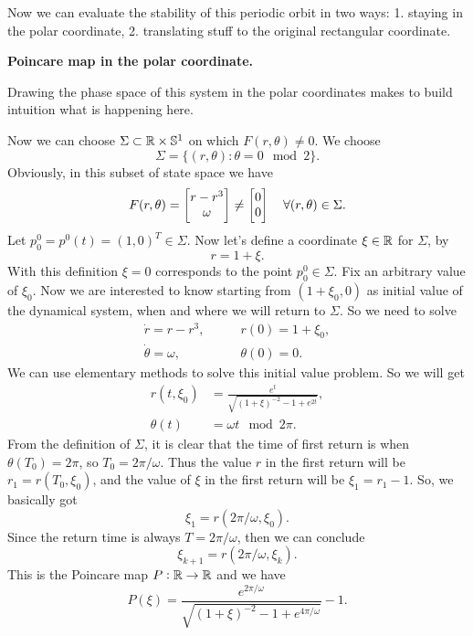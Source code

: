 \begin{ans}
	Now we can evaluate the stability of this periodic orbit in two ways: 1. staying in the polar coordinate, 2. translating stuff to the original rectangular coordinate.
	
	\textbf{Poincare map in the polar coordinate.}		
	
	Drawing the phase space of this system in the polar coordinates makes to build intuition what is happening here.
	
	Now we can choose $\Sigma \subset \mathbb{R}\times\mathbb{S}^1$ on which $F(r,\theta)\neq 0$. We choose
	\[ \Sigma = \{ (r, \theta): \theta =0 \mod2 \}. \]
	Obviously, in this subset of state space we have
	\[ F(r, \theta) = \begin{bmatrix} r - r^3 \\ \omega \end{bmatrix} \neq \begin{bmatrix} 0 \\ 0 \end{bmatrix} \quad \forall (r,\theta) \in \Sigma.\]
	Let $p_0^0 = p^0(t) = (1,0)^T \in \Sigma$. Now let's define a coordinate $\xi\in\mathbb{R}$ for $\Sigma$, by 
	\[ r = 1 + \xi. \]
	With this definition $\xi=0$ corresponds to the point $p_0^0 \in \Sigma$. Fix an arbitrary value of $\xi_0$. Now we are interested to know starting from $(1+\xi_0,0)$ as initial value of the dynamical system, when and where we will return to $\Sigma$. So we need to solve
	\begin{align*}
		\dot{r} = r - r^3, \qquad &r(0) = 1+\xi_0,\\
		\dot{\theta} = \omega, \qquad &\theta(0) = 0.
	\end{align*}
	We can use elementary methods to solve this initial value problem. So we will get
	\begin{align*}
		r(t,\xi_0) &= \frac{e^t}{\sqrt{(1+\xi)^{-2} - 1 + e^{2t}}}, \\
		\theta(t) &= \omega t \mod2\pi.
	\end{align*}
	From the definition of $\Sigma$, it is clear that the time of first return is when $\theta(T_0) = 2\pi$, so $T_0=2\pi/\omega$. Thus the value $r$ in the first return will be $r_1 = r(T_0,\xi_0)$, and the value of $\xi$ in the first return will be $\xi_1 = r_1-1$. So, we basically got
	\[ \xi_1= r(2\pi/\omega,\xi_0).  \]
	Since the return time is always $T = 2\pi/\omega$, then we can conclude
	\[ \xi_{k+1} = r(2\pi/\omega, \xi_k). \]
	This is the Poincare map $P: \mathbb{R} \to \mathbb{R}$ and we have
	\[ P(\xi) = \frac{e^{2\pi/\omega}}{\sqrt{(1+\xi)^{-2} - 1 + e^{4\pi/\omega}}} - 1. \]
	

\end{ans}
